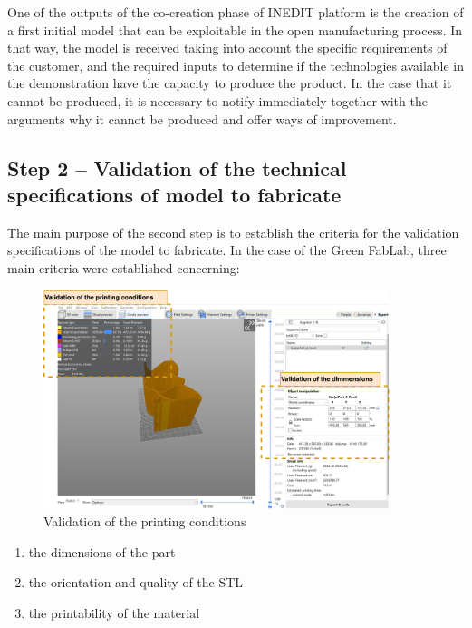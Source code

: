 \documentclass[
  11pt,
]{article}
\providecommand{\tightlist}{%
  \setlength{\itemsep}{0pt}\setlength{\parskip}{0pt}}\usepackage{longtable,booktabs,array}
\begin{document}
One of the outputs of the co-creation phase of INEDIT platform is the
creation of a first initial model that can be exploitable in the open
manufacturing process. In that way, the model is received taking into
account the specific requirements of the customer, and the required
inputs to determine if the technologies available in the demonstration
have the capacity to produce the product. In the case that it cannot be
produced, it is necessary to notify immediately together with the
arguments why it cannot be produced and offer ways of improvement.

\hypertarget{step-2-validation-of-the-technical-specifications-of-model-to-fabricate}{%
\subsection{Step 2 -- Validation of the technical specifications of
model to
fabricate}\label{step-2-validation-of-the-technical-specifications-of-model-to-fabricate}}

The main purpose of the second step is to establish the criteria for the
validation specifications of the model to fabricate. In the case of the
Green FabLab, three main criteria were established concerning:

\begin{figure}[H]

{\centering \includegraphics[width=0.9\textwidth,height=\textheight]{figures/Step-2.png}

}

\caption{\label{fig-step2}Validation of the printing conditions}

\end{figure}

\begin{enumerate}
\def\labelenumi{\arabic{enumi}.}
\tightlist
\item
  the dimensions of the part
\item
  the orientation and quality of the STL
\item
  the printability of the material
\end{enumerate}
\end{document}
